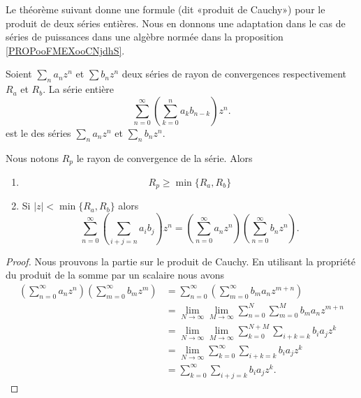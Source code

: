 Le théorème suivant donne une formule (dit «produit de Cauchy») pour le produit de deux séries entières. Nous en donnons une adaptation dans le cas de séries de puissances dans une algèbre normée dans la proposition \ref{PROPooFMEXooCNjdhS}.
\begin{theoremDef}     \label{ThokPTXYC}
    Soient \( \sum_na_nz^n\) et \( \sum b_nz^n\) deux séries de rayon de convergences respectivement \( R_a\) et \( R_b\). La série entière
    \begin{equation}        \label{EqFPGGooDQlXGe}
        \sum_{n=0}^{\infty}\left( \sum_{k=0}^{n}a_kb_{n-k} \right)z^n.
    \end{equation}
    est le  des séries \( \sum_na_nz^n\) et \( \sum_nb_nz^n\).

    Nous notons \( R_p\) le rayon de convergence de la série. Alors
    \begin{enumerate}
        \item
            \begin{equation}
                R_p\geq \min\{ R_a,R_b \}
            \end{equation}
        \item
            Si \( | z |<\min\{ R_a,R_b \}\) alors
            \begin{equation}        \label{EQooSGXHooHwjOEV}
                \sum_{n=0}^{\infty}\left( \sum_{i+j=n}a_ib_j \right)z^n=\left( \sum_{n=0}^{\infty}a_nz^n \right)\left( \sum_{n=0}^{\infty}b_nz^n \right).
            \end{equation}
    \end{enumerate}
\end{theoremDef}

\begin{proof}

    Nous prouvons la partie sur le produit de Cauchy. En utilisant la propriété du produit de la somme par un scalaire nous avons
    \begin{subequations}
        \begin{align}
            \left( \sum_{n=0}^{\infty}a_nz^n \right)\left( \sum_{m=0}^{\infty}b_mz^m \right)&=\sum_{n=0}^{\infty}\left( \sum_{m=0}^{\infty}b_ma_nz^{m+n} \right)\\
            &=\lim_{N\to \infty} \lim_{M\to \infty} \sum_{n=0}^N\sum_{m=0}^Mb_ma_nz^{m+n}\\
            &=\lim_{N\to \infty} \lim_{M\to \infty} \sum_{k=0}^{N+M}\sum_{i+k=k}b_ia_jz^k\\
            &=\lim_{N\to \infty} \sum_{k=0}^{\infty}\sum_{i+k=k}b_ia_jz^k\\
            &=\sum_{k=0}^{\infty}\sum_{i+j=k}b_ia_jz^k.
        \end{align}
    \end{subequations}
\end{proof}

